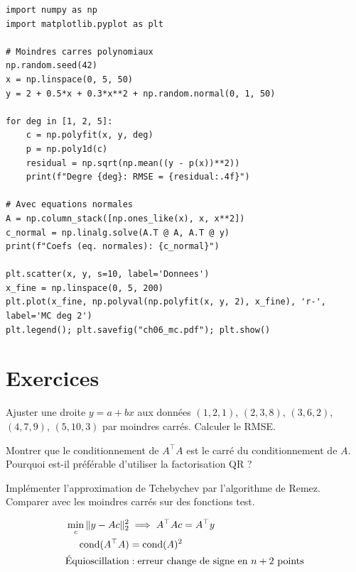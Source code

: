 \begin{codeblock}[title=\textbf{Python}]
\begin{verbatim}
import numpy as np
import matplotlib.pyplot as plt

# Moindres carres polynomiaux
np.random.seed(42)
x = np.linspace(0, 5, 50)
y = 2 + 0.5*x + 0.3*x**2 + np.random.normal(0, 1, 50)

for deg in [1, 2, 5]:
    c = np.polyfit(x, y, deg)
    p = np.poly1d(c)
    residual = np.sqrt(np.mean((y - p(x))**2))
    print(f"Degre {deg}: RMSE = {residual:.4f}")

# Avec equations normales
A = np.column_stack([np.ones_like(x), x, x**2])
c_normal = np.linalg.solve(A.T @ A, A.T @ y)
print(f"Coefs (eq. normales): {c_normal}")

plt.scatter(x, y, s=10, label='Donnees')
x_fine = np.linspace(0, 5, 200)
plt.plot(x_fine, np.polyval(np.polyfit(x, y, 2), x_fine), 'r-', label='MC deg 2')
plt.legend(); plt.savefig("ch06_mc.pdf"); plt.show()
\end{verbatim}
\end{codeblock}

\section{Exercices}

\begin{exercice}[$\star$]
Ajuster une droite $y=a+bx$ aux donn\'ees $(1,2{,}1)$, $(2,3{,}8)$, $(3,6{,}2)$, $(4,7{,}9)$, $(5,10{,}3)$ par moindres carr\'es. Calculer le RMSE.
\end{exercice}

\begin{exercice}[$\star\star$]
Montrer que le conditionnement de $A^\top A$ est le carr\'e du conditionnement de $A$. Pourquoi est-il pr\'ef\'erable d'utiliser la factorisation QR ?
\end{exercice}

\begin{exercice}
Impl\'ementer l'approximation de Tchebychev par l'algorithme de Remez. Comparer avec les moindres carr\'es sur des fonctions test.
\end{exercice}

\begin{formules}
\begin{align*}
\min_c\|y-Ac\|_2^2 &\implies A^\top Ac=A^\top y \\
\mathrm{cond}(A^\top A) &= \mathrm{cond}(A)^2 \\
\text{\'Equioscillation} &: \text{erreur change de signe en }n+2\text{ points}
\end{align*}
\end{formules}
